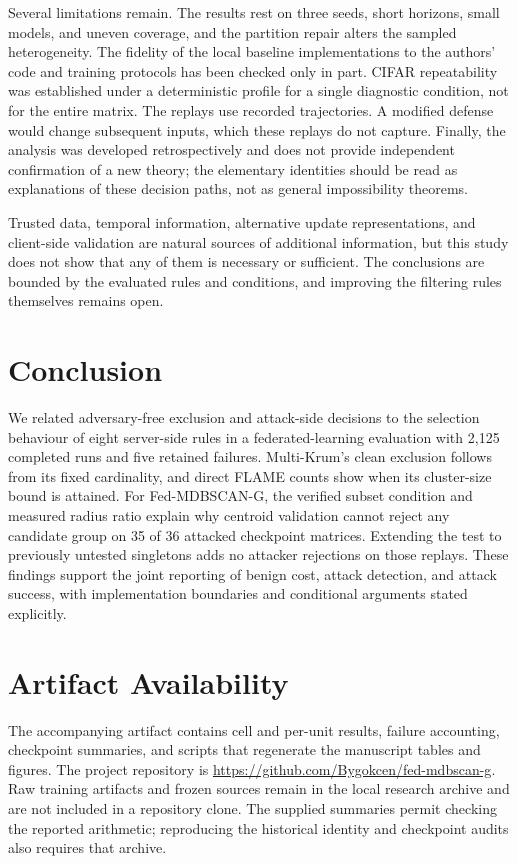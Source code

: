 \documentclass[journal]{IEEEtran}
\newcommand{\method}{Fed-MDBSCAN-G}
\begin{document}
Several limitations remain. The results rest on three seeds, short horizons, small models, and uneven coverage, and the partition repair alters the sampled heterogeneity. The fidelity of the local baseline implementations to the authors' code and training protocols has been checked only in part. CIFAR repeatability was established under a deterministic profile for a single diagnostic condition, not for the entire matrix. The replays use recorded trajectories. A modified defense would change subsequent inputs, which these replays do not capture. Finally, the analysis was developed retrospectively and does not provide independent confirmation of a new theory; the elementary identities should be read as explanations of these decision paths, not as general impossibility theorems.

Trusted data, temporal information, alternative update representations, and client-side validation are natural sources of additional information, but this study does not show that any of them is necessary or sufficient. The conclusions are bounded by the evaluated rules and conditions, and improving the filtering rules themselves remains open.

\section{Conclusion}\label{sec:conclusion}
We related adversary-free exclusion and attack-side decisions to the selection behaviour of eight server-side rules in a federated-learning evaluation with 2{,}125 completed runs and five retained failures. Multi-Krum's clean exclusion follows from its fixed cardinality, and direct FLAME counts show when its cluster-size bound is attained. For \method{}, the verified subset condition and measured radius ratio explain why centroid validation cannot reject any candidate group on 35 of 36 attacked checkpoint matrices. Extending the test to previously untested singletons adds no attacker rejections on those replays. These findings support the joint reporting of benign cost, attack detection, and attack success, with implementation boundaries and conditional arguments stated explicitly.

\section*{Artifact Availability}
The accompanying artifact contains cell and per-unit results, failure accounting, checkpoint summaries, and scripts that regenerate the manuscript tables and figures. The project repository is \url{https://github.com/Bygokcen/fed-mdbscan-g}. Raw training artifacts and frozen sources remain in the local research archive and are not included in a repository clone. The supplied summaries permit checking the reported arithmetic; reproducing the historical identity and checkpoint audits also requires that archive.
\end{document}
